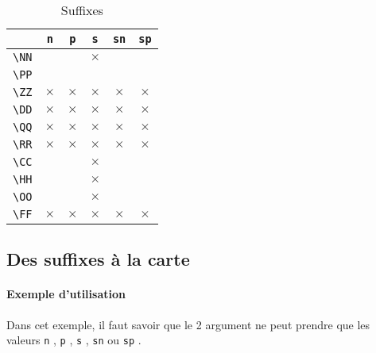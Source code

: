 \documentclass[12pt,a4paper]{article}
\newcommand\env[1]{\texttt{#1}}
\newcommand\macro[1]{\env{\textbackslash{}#1}}
\theoremstyle{definition}
\newcommand\prefix[1]{%
	\texttt{#1}%
}
\begin{document}
\begin{table}[h]
    \caption{Suffixes}
    \begin{center}
        \begin{tabular}{c|c|c|c|c|c}
              & \verb+n+ & \verb+p+ & \verb+s+ & \verb+sn+ & \verb+sp+ \\
            \hline \macro{NN} &          &          & $\times$ &          &          \\
            \hline \macro{PP} &          &          &          &          &          \\
            \hline \macro{ZZ} & $\times$ & $\times$ & $\times$ & $\times$ & $\times$ \\
            \hline \macro{DD} & $\times$ & $\times$ & $\times$ & $\times$ & $\times$ \\
            \hline \macro{QQ} & $\times$ & $\times$ & $\times$ & $\times$ & $\times$ \\
            \hline \macro{RR} & $\times$ & $\times$ & $\times$ & $\times$ & $\times$ \\
            \hline \macro{CC} &          &          & $\times$ &          &          \\
            \hline \macro{HH} &          &          & $\times$ &          &          \\
            \hline \macro{OO} &          &          & $\times$ &          &          \\
            \hline \macro{FF} & $\times$ & $\times$ & $\times$ & $\times$ & $\times$ \\
        \end{tabular}
    \end{center}
    \label{table:suffixes-sets}
\end{table}





\subsection{Des suffixes à la carte}

\paragraph{Exemple d'utilisation}

Dans cet exemple, il faut savoir que le 2\ieme{} argument ne peut prendre que les valeurs \prefix{n}, \prefix{p}, \prefix{s}, \prefix{sn} ou \prefix{sp}.
\end{document}
